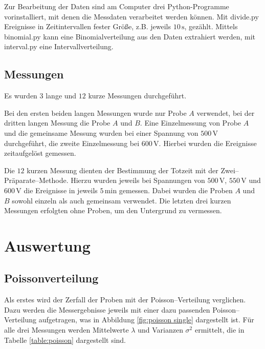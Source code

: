 \documentclass[12pt,a4paper]{scrartcl}
\numberwithin{equation}{section} %
\newcommand{\code}[1]{\textsf{#1}}
\begin{document}
Zur Bearbeitung der Daten sind am Computer drei Python-Programme vorinstalliert, mit denen die Messdaten verarbeitet werden können. Mit \code{divide.py} Ereignisse in Zeitintervallen fester Größe, z.B.  jeweils $10\mathrm{\,s}$, gezählt. Mittels \code{binomial.py} kann eine Binomialverteilung aus den Daten extrahiert werden, mit \code{interval.py} eine Intervallverteilung.

\subsection{Messungen}
Es wurden $3$ lange und $12$ kurze Messungen durchgeführt.

Bei den ersten beiden langen Messungen wurde nur Probe $A$ verwendet, bei der dritten langen Messung die Probe $A$ und $B$. Eine Einzelmessung von Probe $A$ und die gemeinsame Messung wurden bei einer Spannung von $500\mathrm{\,V}$ durchgeführt, die zweite Einzelmessung bei $600\mathrm{\,V}$. Hierbei wurden die Ereignisse zeitaufgelöst gemessen.

Die $12$ kurzen Messung dienten der Bestimmung der Totzeit mit der Zwei--Präparate--Methode. Hierzu wurden jeweils bei Spannungen von $500\mathrm{\,V}$, $550\mathrm{\,V}$ und $600\mathrm{\,V}$ die Ereignisse in jeweils $5\mathrm{\,min}$ gemessen. Dabei wurden die Proben $A$ und $B$ sowohl einzeln als auch gemeinsam verwendet. Die letzten drei kurzen Messungen erfolgten ohne Proben, um den Untergrund zu vermessen.

\clearpage
\hypertarget{auswertung}{%
\section{Auswertung}\label{auswertung}}

\hypertarget{poissonverteilung}{%
\subsection{Poissonverteilung}\label{poissonverteilung}}
Als erstes wird der Zerfall der Proben mit der Poisson--Verteilung verglichen. Dazu werden die Messergebnisse jeweils mit einer dazu passenden Poisson--Verteilung aufgetragen, was in Abbildung \ref{fig:poisson single} dargestellt ist. Für alle drei Messungen werden Mittelwerte $\lambda$ und Varianzen $\sigma^2$ ermittelt, die in Tabelle \ref{table:poisson} dargestellt sind.
\end{document}
